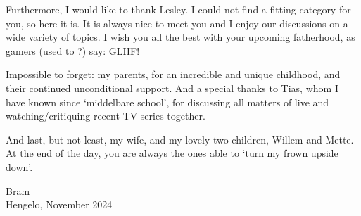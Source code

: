 Furthermore, I would like to thank Lesley. I could not find a fitting category for you, so here it is. It is always nice to meet you and I enjoy our discussions on a wide variety of topics. I wish you all the best with your upcoming fatherhood, as gamers (used to ?) say: GLHF!

Impossible to forget: my parents, for an incredible and unique childhood, and their continued unconditional support. And a special thanks to Tias, whom I have known since `middelbare school', for discussing all matters of live and watching/critiquing recent TV series together.

And last, but not least, my wife, and my lovely two children, Willem and Mette. At the end of the day, you are always the ones able to `turn my frown upside down'.

\vspace{2cm}
\noindent Bram\\
Hengelo, November 2024

